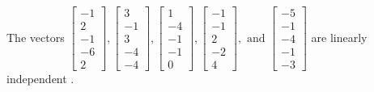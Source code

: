 \begin{exercise}
\begin{exerciseStatement}
  \end{exerciseStatement}
  \begin{exerciseAnswer}
   The vectors \(\left[\begin{array}{r}
-1 \\
2 \\
-1 \\
-6 \\
2
\end{array}\right] , \left[\begin{array}{r}
3 \\
-1 \\
3 \\
-4 \\
-4
\end{array}\right] , \left[\begin{array}{r}
1 \\
-4 \\
-1 \\
-1 \\
0
\end{array}\right] , \left[\begin{array}{r}
-1 \\
-1 \\
2 \\
-2 \\
4
\end{array}\right] , \text{ and } \left[\begin{array}{r}
-5 \\
-1 \\
-4 \\
-1 \\
-3
\end{array}\right]\) are 
  	 linearly independent  .
  


  \end{exerciseAnswer}
\end{exercise}